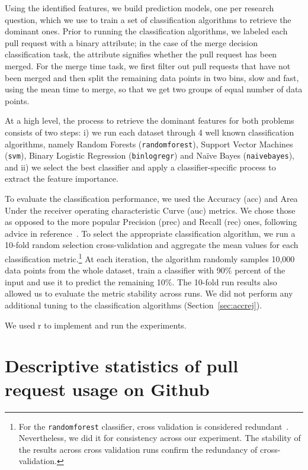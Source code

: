 \documentclass{sig-alternate}
\begin{document}
Using the identified features, we build prediction models, one per research
question, which we use to train a set of classification algorithms to retrieve
the dominant ones. Prior to running the classification algorithms, we labeled
each pull request with a binary attribute; in the case of the \textsf{merge
decision} classification task, the attribute signifies whether the pull request
has been merged. For the \textsf{merge time} task, we first filter out pull
requests that have not been merged and then split the remaining data points in
two bins, slow and fast, using the mean time to merge, so that we get two
groups of equal number of data points.

At a high level, the process to retrieve the dominant features for both
problems consists of two steps: i) we run each dataset through 4 well known
classification algorithms, namely Random Forests (\texttt{randomforest}),
Support Vector Machines (\texttt{svm}), Binary Logistic Regression
(\texttt{binlogregr}) and Na\"ive Bayes (\texttt{naivebayes}), and ii) we select
the best classifier and apply a classifier-specific process to extract the
feature importance. 

To evaluate the classification performance, we used the Accuracy ({\sc acc}) and
Area Under the receiver operating characteristic Curve ({\sc auc}) metrics. We
chose those as opposed to the more popular Precision ({\sc prec}) and Recall
({\sc rec}) ones, following advice in reference~\cite{Lessm08}. To select the
appropriate classification algorithm, we run a 10-fold random selection
cross-validation and aggregate the mean values for each classification
metric.\footnote{For the \texttt{randomforest} classifier, cross validation is
considered redundant~\cite{Breim01}. Nevertheless, we did it for consistency
across our experiment. The stability of the results across cross validation runs
confirm the redundancy of cross-validation.} At each iteration, the algorithm
randomly samples 10,000 data points from the whole dataset, train a
classifier with 90\% percent of the input and use it to predict the remaining
10\%. The 10-fold run results also allowed us to evaluate the metric stability
across runs. We did not perform any additional tuning to the classification
algorithms (Section~\ref{sec:accrej}).

We used {\sc r} to implement and run the experiments.

\section{Descriptive statistics of pull request usage on Github}
\label{sec:github}
\end{document}
